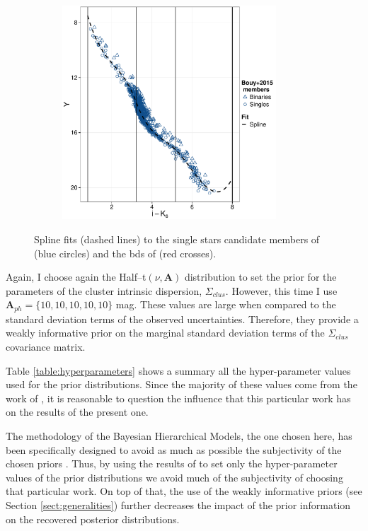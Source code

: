 \begin{figure}[ht!]
\begin{subfigure}[t]{0.48\textwidth}
        \caption{}   
    \end{subfigure}
     \begin{subfigure}[t]{0.48\textwidth}
      \includegraphics[page=8,height=8cm,width=\textwidth]{background/Figures/Photometry_fit.pdf}
        \caption{}
    \end{subfigure}
\caption{Spline fits (dashed lines) to the single stars candidate members of \citet{Bouy2015} (blue circles) and the \glspl{bd} of \citet{Faherty2012} (red crosses).}
\label{fig:fitCMDsBD}
\end{figure}


Again, I choose again the Half--t$(\nu,\boldsymbol{A})$ distribution to set the prior for the parameters of the cluster intrinsic dispersion, $\Sigma_{clus}$.  However, this time I use  $\boldsymbol{A}_{ph}=\{10,10,10,10,10\}$ mag. These values are large when compared to the standard deviation terms of the observed uncertainties. Therefore, they provide a weakly informative prior on the marginal standard deviation terms of the $\Sigma_{clus}$ covariance matrix.

Table \ref{table:hyperparameters} shows a summary all the hyper-parameter values used for the prior distributions. {Since the majority of these values come from the work of \citet{Bouy2015}, it is reasonable to question the influence that this particular work has on the results of the present one.}

{The methodology of the Bayesian Hierarchical Models, the one chosen here, has been specifically designed to avoid as much as possible the subjectivity of the chosen priors \citep{Gelman2006}. Thus, by using the results of \citet{Bouy2015} to set only the hyper-parameter values of the prior distributions we avoid much of the subjectivity of choosing that particular work. On top of that, the use of the weakly informative priors (see Section \ref{sect:generalities}) further decreases the impact of the prior information on the recovered posterior distributions.}

